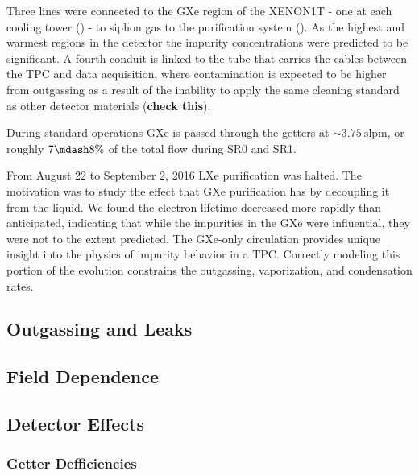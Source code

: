 Three lines were connected to the GXe region of the XENON1T - one at each cooling tower
() - to siphon gas to the purification system
().  As the highest and warmest regions in the detector the impurity concentrations were predicted to be
significant.  A fourth conduit is linked to the tube that carries the cables between the TPC and data acquisition, where contamination
is expected to be higher from outgassing as a result of the inability to apply the same cleaning standard as other detector materials
(\textbf{check this}).

During standard operations GXe is passed through the getters at ${\sim} 3.75\ \mathrm{slpm}$, or roughly $7 \mdash 8\%$ of the total
flow during SR0 and SR1.

From August 22 to September 2, 2016 LXe purification was halted.  The motivation was to study the effect that GXe purification has by
decoupling it from the liquid.  We found the electron lifetime decreased more rapidly than anticipated, indicating that while the
impurities in the GXe were influential, they were not to the extent predicted.  The GXe-only circulation provides unique insight into
the physics of impurity behavior in a TPC.  Correctly modeling this portion of the evolution constrains the outgassing, vaporization,
and condensation rates.



\subsection{Outgassing and Leaks}
\label{subsec:electron_lifetime_model_outgassing}



\subsection{Field Dependence}
\label{subsec:electron_lifetime_model_field}



\subsection{Detector Effects}
\label{subsec:electron_lifetime_model_detector_effects}



\subsubsection{Getter Defficiencies}
\label{subsubsec:electron_lifetime_model_detector_effects_getter}



